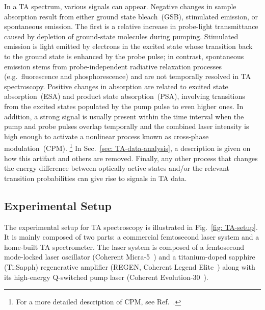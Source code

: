 In a TA spectrum, various signals can appear.
%
Negative changes in sample absorption result from either ground state bleach~(GSB),
stimulated emission, or spontaneous emission. The first is a relative increase in
probe-light transmittance caused by depletion of ground-state molecules during pumping.
Stimulated emission is light emitted by electrons in the excited state
whose transition back to the ground state is enhanced by the probe pulse;
in contrast, spontaneous emission stems from probe-independent
radiative relaxation processes (e.g.~fluorescence and phosphorescence) and
are not temporally resolved in TA spectroscopy.
%
Positive changes in absorption are related to
excited state absorption~(ESA) and product state absorption~(PSA),
involving transitions from the excited states populated by the pump pulse to
even higher ones.
%
In addition, a strong signal is usually present
within the time interval when the pump and probe pulses overlap temporally and the combined
laser intensity is high enough to activate a nonlinear process known as
cross-phase modulation~(CPM).%
\footnote{For a more detailed description of CPM, see Ref.~\cite{Islam1987}.}
In Sec.~\ref{sec: TA-data-analysis}, a description is given on how this artifact and others
are removed.
Finally, any other process that changes the energy difference between optically active states
and/or the relevant transition probabilities can give rise to signals in TA data.

\subsection{Experimental Setup}
\label{sec: TA-setup}

The experimental setup for TA spectroscopy is illustrated in Fig.~\ref{fig: TA-setup}.
It is mainly composed of two parts: a commercial femtosecond laser system and
a home-built TA spectrometer.
%
The laser system is composed of
a femtosecond mode-locked laser oscillator (Coherent Micra-5~\cite{MicraManual})
and a titanium-doped sapphire (Ti:Sapph) regenerative amplifier
(REGEN, Coherent Legend Elite~\cite{LegendManual})
along with its high-energy Q-switched pump laser (Coherent Evolution-30~\cite{EvolutionManual}).

